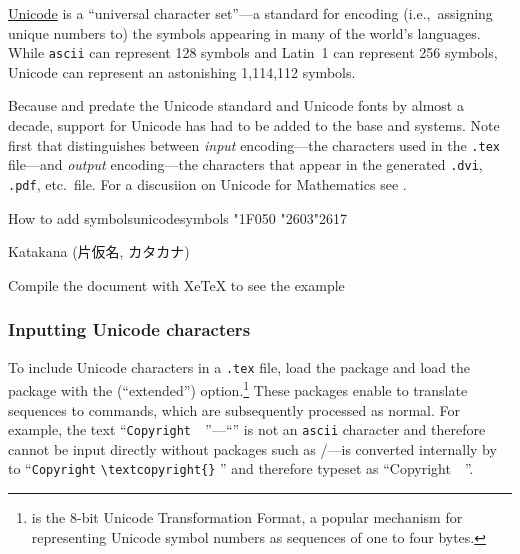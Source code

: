 
\href{http://www.unicode.org/}{Unicode} is a \enquote{universal character
set}---a standard for encoding (i.e.,~assigning unique numbers to)
the symbols appearing in many of the world's languages.  While \texttt{ascii}
can represent 128 symbols and Latin~1 can represent 256 symbols,
Unicode can represent an astonishing 1,114,112 symbols.

Because \tex and \latex{} predate the Unicode standard and Unicode
fonts by almost a decade, support for Unicode has had to be added to
the base \tex{} and \latex{} systems.  Note first that \latex{}
distinguishes between \emph{input} encoding---the characters used in
the \texttt{.tex} file---and \emph{output} encoding---the characters
that appear in the generated \texttt{.dvi}, \texttt{.pdf}, etc.\ file.
For a discusiion on Unicode for Mathematics see \citep{beetona}.

\begin{texexample}{How to add symbols}{unicodesymbols}
\ifxetex
  \codetwothousand\char"1F050 \char"2603\char"2617
  {\codetwothousand {} 
    Katakana (片仮名, カタカナ)
   \codetwothousandone {}
   \symbola {}
   
  }
\else
   Compile the document with XeTeX to see the example
\fi
\end{texexample}

\subsubsection{Inputting Unicode characters}

To include Unicode characters in a \texttt{.tex} file, load the
 package and load the  package with the
 (``\utfviii extended'')
option.\footnote{\utfviii is the 8-bit Unicode Transformation Format,
  a popular mechanism for representing Unicode symbol numbers as
  sequences of one to four bytes.}  These packages enable \latex{} to
translate \utfviii sequences to \latex{} commands, which are
subsequently processed as normal.  For example, the \utfviii text
``\texttt{Copyright~\textcopyright\ \the\year}''---``\texttt{\textcopyright}''
is not an \texttt{ascii} character and therefore cannot be input directly
without packages such as /---is
converted internally by  to ``\texttt{Copyright}
\verb+\textcopyright{}+ \texttt{\the\year}'' and therefore typeset as
``Copyright~\textcopyright\ \the\year''.

